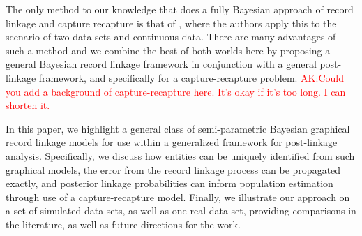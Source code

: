 \documentclass[11pt]{article}\usepackage[]{graphicx}\usepackage[]{color}
\begin{document}

The only method to our knowledge that does a fully Bayesian approach of record linkage and capture recapture is that of \citep{LiseoTancredi11}, where the authors apply this to the scenario of two data sets and continuous data. There are many advantages of such a method and we combine the best of both worlds here by proposing a general Bayesian record linkage framework in conjunction with a general post-linkage framework, and specifically for a capture-recapture problem. 
\textcolor{red}{AK:Could you add a background of capture-recapture here. It's okay if it's too long. I can shorten it.}

In this paper, we highlight a general class of semi-parametric Bayesian graphical record linkage models for use within a generalized framework for post-linkage analysis. Specifically, we discuss how entities can be uniquely identified from such graphical models, the error from the record linkage process can be propagated exactly, and posterior linkage probabilities can inform population estimation through use of a capture-recapture model. Finally, we illustrate our approach on a set of simulated data sets, as well as one real data set, providing comparisons in the literature, as well as future directions for the work.

\end{document}

